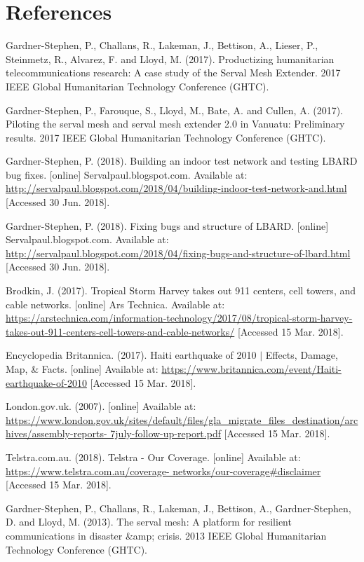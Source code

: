 \chapter{References}

Gardner-Stephen, P., Challans, R., Lakeman, J., Bettison, A., Lieser, P., Steinmetz, R., Alvarez, F. and Lloyd, M. (2017). Productizing humanitarian telecommunications research: A case study of the Serval Mesh Extender. 2017 IEEE Global Humanitarian Technology Conference (GHTC).

\hfill \break
Gardner-Stephen, P., Farouque, S., Lloyd, M., Bate, A. and Cullen, A. (2017). Piloting the serval mesh and serval mesh extender 2.0 in Vanuatu: Preliminary results. 2017 IEEE Global Humanitarian Technology Conference (GHTC).

\hfill \break
Gardner-Stephen, P. (2018). Building an indoor test network and testing LBARD bug fixes. [online] Servalpaul.blogspot.com. Available at: \url{http://servalpaul.blogspot.com/2018/04/building-indoor-test-network-and.html} [Accessed 30 Jun. 2018].

\hfill \break
Gardner-Stephen, P. (2018). Fixing bugs and structure of LBARD. [online] Servalpaul.blogspot.com. Available at: 
\url{http://servalpaul.blogspot.com/2018/04/fixing-bugs-and-structure-of-lbard.html} [Accessed 30 Jun. 2018].

\hfill \break
Brodkin, J. (2017). Tropical Storm Harvey takes out 911 centers, cell towers, and cable networks. [online]
Ars Technica. Available at: \url{https://arstechnica.com/information-technology/2017/08/tropical-storm-harvey-
takes-out-911-centers-cell-towers-and-cable-networks/} [Accessed 15 Mar. 2018].

\hfill \break
Encyclopedia Britannica. (2017). Haiti earthquake of 2010 $|$ Effects, Damage, Map, \& Facts. [online]
Available at: \url{https://www.britannica.com/event/Haiti-earthquake-of-2010} [Accessed 15 Mar. 2018].


\hfill \break
London.gov.uk. (2007). [online] Available at:
\url{https://www.london.gov.uk/sites/default/files/gla_migrate_files_destination/archives/assembly-reports-
7july-follow-up-report.pdf} [Accessed 15 Mar. 2018].

\hfill \break
Telstra.com.au. (2018). Telstra - Our Coverage. [online] Available at: \url{https://www.telstra.com.au/coverage-
networks/our-coverage#disclaimer} [Accessed 15 Mar. 2018].


\hfill \break
Gardner-Stephen, P., Challans, R., Lakeman, J., Bettison, A., Gardner-Stephen, D. and Lloyd, M. (2013). The serval
mesh: A platform for resilient communications in disaster \&amp; crisis. 2013 IEEE Global Humanitarian Technology
Conference (GHTC).
